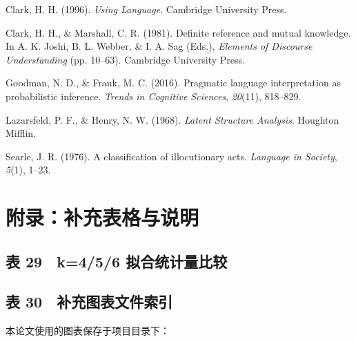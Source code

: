 \documentclass[12pt,a4paper,openany,oneside]{ctexrep}
\begin{document}
Clark, H. H. (1996). \emph{Using Language}. Cambridge University Press.

Clark, H. H., \& Marshall, C. R. (1981). Definite reference and mutual knowledge. In A. K. Joshi, B. L. Webber, \& I. A. Sag (Eds.), \emph{Elements of Discourse Understanding} (pp. 10–63). Cambridge University Press.

Goodman, N. D., \& Frank, M. C. (2016). Pragmatic language interpretation as probabilistic inference. \emph{Trends in Cognitive Sciences}, \emph{20}(11), 818–829.

Lazarsfeld, P. F., \& Henry, N. W. (1968). \emph{Latent Structure Analysis}. Houghton Mifflin.

Searle, J. R. (1976). A classification of illocutionary acts. \emph{Language in Society}, \emph{5}(1), 1–23.

\section{附录：补充表格与说明}


\subsection{表 29　k=4/5/6 拟合统计量比较}


\begin{table}[htbp]
\centering
\caption{表 29：k=4/5/6 拟合统计量比较}
\small
{}
\end{table}

\subsection{表 30　补充图表文件索引}


本论文使用的图表保存于项目目录下：
\end{document}
